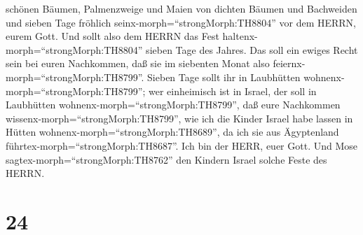 schönen Bäumen, Palmenzweige und Maien von dichten Bäumen und Bachweiden
und sieben Tage fröhlich seinx-morph=``strongMorph:TH8804'' vor dem
HERRN, eurem Gott.  Und sollt also dem HERRN das Fest
haltenx-morph=``strongMorph:TH8804'' sieben Tage des Jahres. Das soll
ein ewiges Recht sein bei euren Nachkommen, daß sie im siebenten Monat
also feiernx-morph=``strongMorph:TH8799''.  Sieben Tage
sollt ihr in Laubhütten wohnenx-morph=``strongMorph:TH8799''; wer
einheimisch ist in Israel, der soll in Laubhütten
wohnenx-morph=``strongMorph:TH8799'',  daß eure Nachkommen
wissenx-morph=``strongMorph:TH8799'', wie ich die Kinder Israel habe
lassen in Hütten wohnenx-morph=``strongMorph:TH8689'', da ich sie aus
Ägyptenland führtex-morph=``strongMorph:TH8687''. Ich bin der HERR, euer
Gott.  Und Mose sagtex-morph=``strongMorph:TH8762'' den
Kindern Israel solche Feste des HERRN.

\hypertarget{section-23}{%
\section{24}\label{section-23}}


